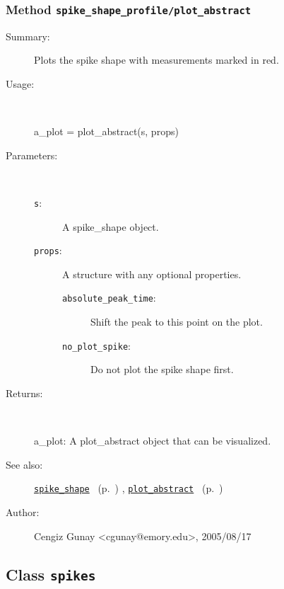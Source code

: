 \subsubsection[Method \texttt{plot\_abstract}]{Method \texttt{spike\_shape\_profile/plot\_abstract}}%
%
\label{ref_spike_shape_profile__plot_abstract}%
\hypertarget{ref_spike_shape_profile__plot_abstract}{}%
\begin{description}
\item[Summary:]Plots the spike shape with measurements marked in red.
%
\item[Usage:]~%
\begin{lyxcode}%
a\_plot = plot\_abstract(s, props)
%
\end{lyxcode}%
%
%
\item[Parameters:]~
\begin{description}%
\item[\texttt{s}:]
 A spike\_shape object.
\item[\texttt{props}:]
 A structure with any optional properties.
\begin{description}%
\item[\texttt{absolute\_peak\_time}:]
 Shift the peak to this point on the plot.
\item[\texttt{no\_plot\_spike}:]
 Do not plot the spike shape first.
\end{description}%
\end{description}%
%
\item[Returns:]~

	a\_plot: A plot\_abstract object that can be visualized.
%
%
\item[See also:]%
\hyperlink{ref_spike_shape}{\texttt{spike\_shape}}%
\ (p.~\pageref{ref_spike_shape})%
%
, \hyperlink{ref_plot_abstract}{\texttt{plot\_abstract}}%
\ (p.~\pageref{ref_plot_abstract})%
%
%
\item[Author:]%
Cengiz Gunay <cgunay@emory.edu>, 2005/08/17%
\end{description}
\methodline%
\subsection{Class \texttt{spikes}}%
%
\label{ref_spikes}%
\hypertarget{ref_spikes}{}%
